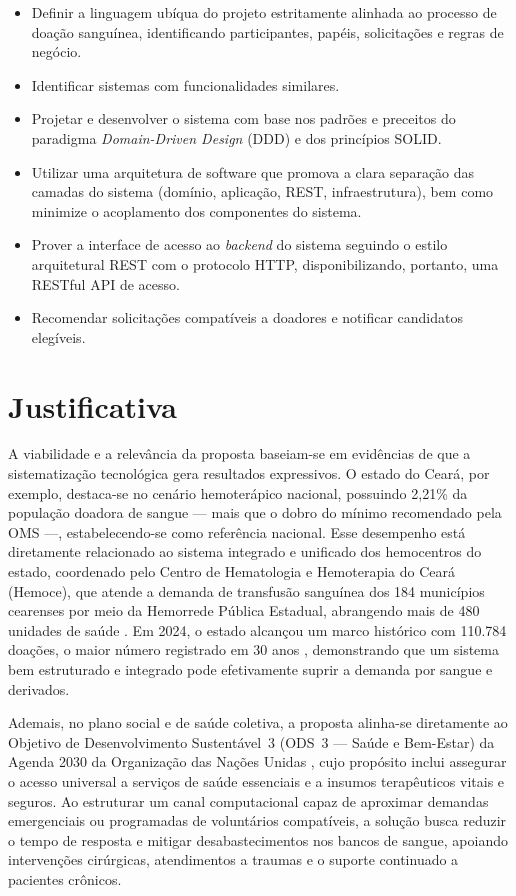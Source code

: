 \begin{itemize}[leftmargin=*]
  \item[\textbf{O1}] Definir a linguagem ubíqua do projeto estritamente alinhada ao processo de doação sanguínea, identificando participantes, papéis, solicitações e regras de negócio.
  \item[\textbf{O2}] Identificar sistemas com funcionalidades similares.
  \item[\textbf{O3}] Projetar e desenvolver o sistema com base nos padrões e preceitos do paradigma \textit{Domain-Driven Design} (DDD) e dos princípios SOLID.
  \item[\textbf{O4}] Utilizar uma arquitetura de software que promova a clara separação das camadas do sistema (domínio, aplicação, REST, infraestrutura), bem como minimize o acoplamento dos componentes do sistema.
  \item[\textbf{O5}] Prover a interface de acesso ao \textit{backend} do sistema seguindo o estilo arquitetural REST com o protocolo HTTP, disponibilizando, portanto, uma RESTful API de acesso.
  \item[\textbf{O6}] Recomendar solicitações compatíveis a doadores e notificar candidatos elegíveis.
\end{itemize}

\section{Justificativa}

A viabilidade e a relevância da proposta baseiam-se em evidências de que a sistematização tecnológica gera resultados expressivos. O estado do Ceará, por exemplo, destaca-se no cenário hemoterápico nacional, possuindo 2,21\% da população doadora de sangue \cite{ceara2021} --- mais que o dobro do mínimo recomendado pela OMS ---, estabelecendo-se como referência nacional. Esse desempenho está diretamente relacionado ao sistema integrado e unificado dos hemocentros do estado, coordenado pelo Centro de Hematologia e Hemoterapia do Ceará (Hemoce), que atende a demanda de transfusão sanguínea dos 184 municípios cearenses por meio da Hemorrede Pública Estadual, abrangendo mais de 480 unidades de saúde \cite{hemoce2022}. Em 2024, o estado alcançou um marco histórico com 110.784 doações, o maior número registrado em 30 anos \cite{ceara2025}, demonstrando que um sistema bem estruturado e integrado pode efetivamente suprir a demanda por sangue e derivados.

Ademais, no plano social e de saúde coletiva, a proposta alinha-se diretamente ao Objetivo de Desenvolvimento Sustentável~3 (ODS~3 --- Saúde e Bem-Estar) da Agenda 2030 da Organização das Nações Unidas \cite{onu2015}, cujo propósito inclui assegurar o acesso universal a serviços de saúde essenciais e a insumos terapêuticos vitais e seguros. Ao estruturar um canal computacional capaz de aproximar demandas emergenciais ou programadas de voluntários compatíveis, a solução busca reduzir o tempo de resposta e mitigar desabastecimentos nos bancos de sangue, apoiando intervenções cirúrgicas, atendimentos a traumas e o suporte continuado a pacientes crônicos.

